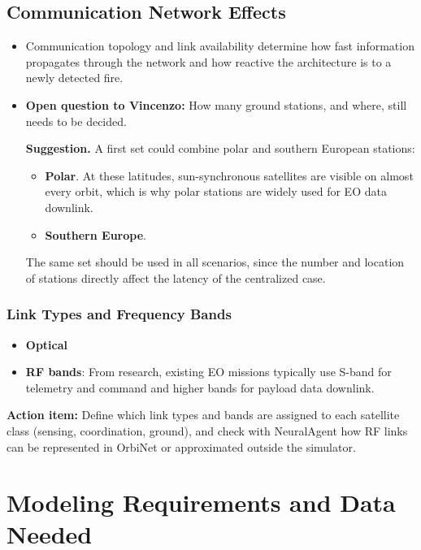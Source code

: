 \documentclass[11pt]{article}
\newcommand{\vincenzoq}[1]{\textcolor{vincenzoq}{\textbf{Open question to Vincenzo:}} #1}
\newcommand{\actionitem}[1]{\textcolor{todo}{\textbf{Action item:}} #1}
\begin{document}
\subsection{Communication Network Effects}\label{sec:comm}
\begin{itemize}[leftmargin=1.2cm]
    \item Communication topology and link availability determine how fast information propagates through the network and how reactive the architecture is to a newly detected fire.
    \item \vincenzoq{How many ground stations, and where, still needs to be decided.}

    \textbf{Suggestion.} A first set could combine polar and southern European stations:
    \begin{itemize}
        \item \textbf{Polar}. At these latitudes, sun-synchronous satellites are visible on almost every orbit, which is why polar stations are widely used for EO data downlink.
        \item \textbf{Southern Europe}.
    \end{itemize}
    The same set should be used in all scenarios, since the number and location of stations directly affect the latency of the centralized case.
\end{itemize}

\subsubsection{Link Types and Frequency Bands}\label{sec:bands}
    \begin{itemize}
        \item \textbf{Optical}
        \item \textbf{RF bands}: From research, existing EO missions typically use S-band for telemetry and command and higher bands for payload data downlink.
    \end{itemize}
\actionitem{Define which link types and bands are assigned to each satellite class (sensing, coordination, ground), and check with NeuralAgent how RF links can be represented in OrbiNet or approximated outside the simulator.}

\section{Modeling Requirements and Data Needed}
\end{document}
